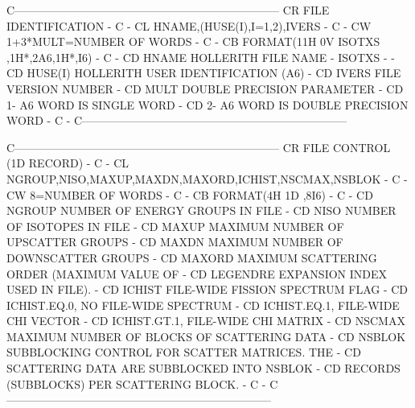 \begin{ccode}
C-----------------------------------------------------------------------
CR          FILE IDENTIFICATION                                        -
C                                                                      -
CL    HNAME,(HUSE(I),I=1,2),IVERS                                      -
C                                                                      -
CW    1+3*MULT=NUMBER OF WORDS                                         -
C                                                                      -
CB    FORMAT(11H 0V ISOTXS  ,1H*,2A6,1H*,I6)                           -
C                                                                      -
CD    HNAME       HOLLERITH FILE NAME - ISOTXS -                       -
CD    HUSE(I)     HOLLERITH USER IDENTIFICATION (A6)                   -
CD    IVERS       FILE VERSION NUMBER                                  -
CD    MULT        DOUBLE PRECISION PARAMETER                           -
CD                    1- A6 WORD IS SINGLE WORD                        -
CD                    2- A6 WORD IS DOUBLE PRECISION WORD              -
C                                                                      -
C-----------------------------------------------------------------------

C-----------------------------------------------------------------------
CR          FILE CONTROL   (1D RECORD)                                 -
C                                                                      -
CL    NGROUP,NISO,MAXUP,MAXDN,MAXORD,ICHIST,NSCMAX,NSBLOK              -
C                                                                      -
CW    8=NUMBER OF WORDS                                                -
C                                                                      -
CB    FORMAT(4H 1D ,8I6)                                               -
C                                                                      -
CD    NGROUP        NUMBER OF ENERGY GROUPS IN FILE                    -
CD    NISO          NUMBER OF ISOTOPES IN FILE                         -
CD    MAXUP         MAXIMUM NUMBER OF UPSCATTER GROUPS                 -
CD    MAXDN         MAXIMUM NUMBER OF DOWNSCATTER GROUPS               -
CD    MAXORD        MAXIMUM SCATTERING ORDER (MAXIMUM VALUE OF         -
CD                     LEGENDRE EXPANSION INDEX USED IN FILE).         -
CD    ICHIST        FILE-WIDE FISSION SPECTRUM FLAG                    -
CD                     ICHIST.EQ.0,      NO FILE-WIDE SPECTRUM         -
CD                     ICHIST.EQ.1,      FILE-WIDE CHI VECTOR          -
CD                     ICHIST.GT.1,      FILE-WIDE CHI MATRIX          -
CD    NSCMAX        MAXIMUM NUMBER OF BLOCKS OF SCATTERING DATA        -
CD    NSBLOK        SUBBLOCKING CONTROL FOR SCATTER MATRICES. THE      -
CD                     SCATTERING DATA ARE SUBBLOCKED INTO NSBLOK      -
CD                     RECORDS (SUBBLOCKS) PER SCATTERING BLOCK.       -
C                                                                      -
C-----------------------------------------------------------------------


\end{ccode}
